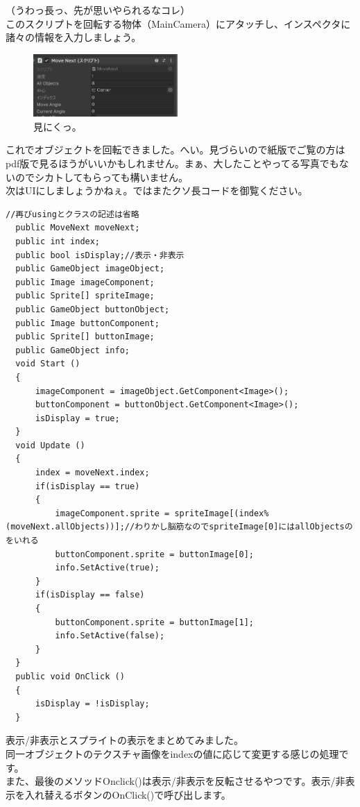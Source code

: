 \documentclass[b5paper,9pt,platex,dvipdfmx]{jsarticle}
\begin{document}
\begin{multicols*}{3}
（うわっ長っ、先が思いやられるなコレ）\\
このスクリプトを回転する物体（MainCamera）にアタッチし、インスペクタに諸々の情報を入力しましょう。\\
\begin{figure}[H]
  \centering
  \includegraphics[width=5.5cm]{4.png}
  \caption{見にくっ。}
\end{figure}
これでオブジェクトを回転できました。へい。見づらいので紙版でご覧の方はpdf版で見るほうがいいかもしれません。まぁ、大したことやってる写真でもないのでシカトしてもらっても構いません。\\
次はUIにしましょうかねぇ。ではまたクソ長コードを御覧ください。\\
\begin{lstlisting}[caption=UIDraw.cs]
  //再びusingとクラスの記述は省略
  public MoveNext moveNext;
  public int index;
  public bool isDisplay;//表示・非表示
  public GameObject imageObject;
  public Image imageComponent;
  public Sprite[] spriteImage;
  public GameObject buttonObject;
  public Image buttonComponent;
  public Sprite[] buttonImage;
  public GameObject info;
  void Start ()
  {
      imageComponent = imageObject.GetComponent<Image>();
      buttonComponent = buttonObject.GetComponent<Image>();
      isDisplay = true;
  }
  void Update ()
  {
      index = moveNext.index;
      if(isDisplay == true)
      {
          imageComponent.sprite = spriteImage[(index%(moveNext.allObjects))];//わりかし脳筋なのでspriteImage[0]にはallObjectsのをいれる
          buttonComponent.sprite = buttonImage[0];
          info.SetActive(true);
      }
      if(isDisplay == false)
      {
          buttonComponent.sprite = buttonImage[1];
          info.SetActive(false);
      }
  }
  public void OnClick ()
  {
      isDisplay = !isDisplay;
  }
\end{lstlisting}
表示/非表示とスプライトの表示をまとめてみました。\\
同一オブジェクトのテクスチャ画像をindexの値に応じて変更する感じの処理です。\\
また、最後のメソッドOnclick()は表示/非表示を反転させるやつです。表示/非表示を入れ替えるボタンのOnClick()で呼び出します。\\

\end{multicols*}
\end{document}
